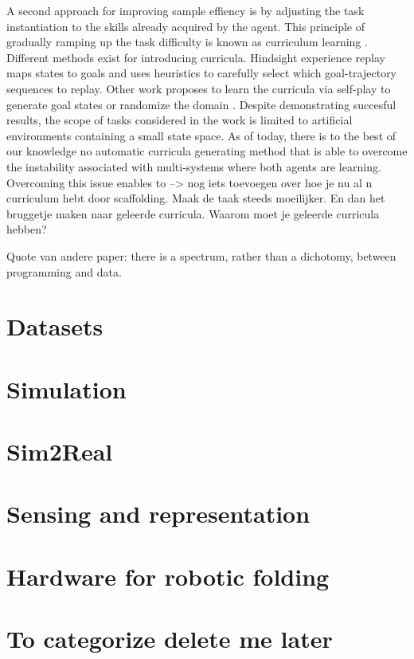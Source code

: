 \documentclass[\home/main.tex]{subfiles}
\begin{document}
A second approach for improving sample effiency is by adjusting the task instantiation to the skills already acquired by the agent. This principle of gradually ramping up the task difficulty is known as curriculum learning \autocite{Selfridge1985}. Different methods exist for introducing curricula. Hindsight experience replay \autocite{andrychowicz2017hindsight} maps states to goals and uses heuristics to carefully select which goal-trajectory sequences to replay. Other work proposes to learn the curricula via self-play to generate goal states \autocite{sukhbaatar2017intrinsic} or randomize the domain \autocite{raparthy2020generating}. Despite demonstrating succesful results, the scope of tasks considered in the work is limited to artificial environments containing a small state space. As of today, there is to the best of our knowledge no automatic curricula generating method that is able to overcome the instability associated with multi-systems where both agents are learning. Overcoming this issue enables to  
--> nog iets toevoegen over hoe je nu al n curriculum hebt door scaffolding. Maak de taak steeds moeilijker. En dan het bruggetje maken naar geleerde curricula. Waarom moet je geleerde curricula hebben?



Quote van andere paper: there is a spectrum, rather than a dichotomy, between programming and data.

\section{Datasets}

\section{Simulation}

\section{Sim2Real}

\section{Sensing and representation} \label{sec:towards_sensing_representation}

\section{Hardware for robotic folding}

\section{To categorize delete me later}

\printbibliography
\end{document}
